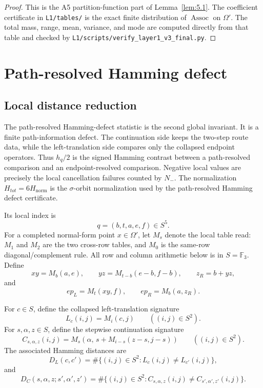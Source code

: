 \documentclass[11pt]{article}
\theoremstyle{definition}
\begin{document}
\begin{proof}
This is the A5 partition-function part of Lemma~\ref{lem:5.1}. The
coefficient certificate in \texttt{L1/tables/} is the exact finite
distribution of \(\operatorname{Assoc}\) on \(\Omega'\).  The total mass,
range, mean, variance, and mode are computed directly from that table and
checked by \texttt{L1/scripts/verify\_layer1\_v3\_final.py}.
\end{proof}


\section{Path-resolved Hamming defect}\label{path-resolved-hamming-defect}\label{hamming-defect-statistic}

\subsection{Local distance reduction}\label{h-local-distance-reduction}\label{local-distance-reduction}

The path-resolved Hamming-defect statistic is the second global invariant.  It is a finite path-information defect.
The continuation side keeps the two-step route data, while the
left-translation side compares only the collapsed endpoint operators.
Thus \(h_q/2\) is the signed Hamming contrast between a path-resolved
comparison and an endpoint-resolved comparison. Negative local values
are precisely the local cancellation failures counted by \(N_-\). The
normalization \(H_{tot}=6H_{\mathrm{norm}}\) is the \(\sigma\)-orbit normalization
used by the path-resolved Hamming defect certificate.

Its local index is
\[
q=(b,t,a,e,f)\in S^5.
\]
For a completed normal-form point \(x\in\Omega'\), let \(M_s\) denote
the local table read: \(M_1\) and \(M_2\) are the two cross-row tables,
and \(M_0\) is the same-row diagonal/complement rule. All row and column
arithmetic below is in \(S=\mathbb F_3\). Define
\[
xy=M_b(a,e),
\qquad
yz=M_{t-b}(e-b,f-b),
\qquad
z_R=b+yz,
\]
and
\[
ep_L=M_t(xy,f),
\qquad
ep_R=M_b(a,z_R).
\]

For \(c\in S\), define the collapsed left-translation signature
\[
L_c(i,j)=M_i(c,j)
\qquad ((i,j)\in S^2).
\]
For \(s,\alpha,z\in S\), define the stepwise continuation signature
\[
C_{s,\alpha,z}(i,j)
=
M_s\!\left(
\alpha,\,
s+M_{i-s}(z-s,j-s)
\right)
\qquad ((i,j)\in S^2).
\]
The associated Hamming distances are
\[
D_L(c,c')
=
\#\{(i,j)\in S^2:L_c(i,j)\ne L_{c'}(i,j)\},
\]
and
\[
D_C(s,\alpha,z;s',\alpha',z')
=
\#\{(i,j)\in S^2:
C_{s,\alpha,z}(i,j)\ne C_{s',\alpha',z'}(i,j)\}.
\]
\end{document}
